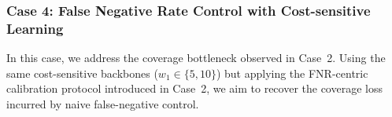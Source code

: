 \documentclass[journal]{IEEEtran}
\theoremstyle{remark}
\begin{document}
\subsubsection{\textbf{Case 4: False Negative Rate Control with Cost-sensitive Learning}}
\label{sec:case4_results}

In this case, we address the coverage bottleneck observed in Case~2. Using the same cost-sensitive backbones ($w_{1} \in \{5, 10\}$) but applying the FNR-centric calibration protocol introduced in Case~2, we aim to recover the coverage loss incurred by naive false-negative control.

\begin{table}[htbp]
    \vskip -0.1in
    \centering
    \caption{The selective classification performance of Case 4 ($w_{1}=5$ and $w_{1}=10$).}
    \label{tab:case4_results}
    \vskip -0.1in
    \vskip -0.1in
\end{table}
\end{document}
